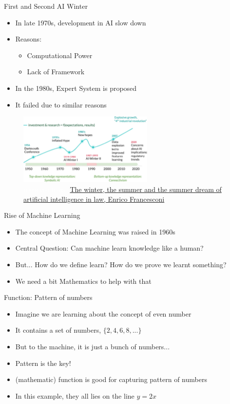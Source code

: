 \documentclass[10pt,xcolor={table,dvipsnames},t]{beamer}
\begin{document}
\begin{frame}{First and Second AI Winter}
  \begin{itemize}
    \item In late 1970s, development in AI slow down
    \item Reasons:
    \begin{itemize}
      \item Computational Power
      \item Lack of Framework
    \end{itemize}
    \item In the 1980s, Expert System is proposed
    \item It failed due to similar reasons
  \end{itemize}
  \begin{figure}
    \includegraphics[width=0.6\textwidth]{img/AIwinter.png}
    \caption{\textcolor{white}{retrieved from: } \href{https://link.springer.com/article/10.1007/s10506-022-09309-8}{The winter, the summer and the summer dream of artificial intelligence in law, Enrico Francesconi}}
  \end{figure}
\end{frame}

\begin{frame}{Rise of Machine Learning}
  \begin{itemize}
    \item The concept of Machine Learning was raised in 1960s
    \item Central Question: Can machine learn knowledge like a human?
    \item But... How do we define learn? How do we prove we learnt something?
    \item We need a bit Mathematics to help with that
  \end{itemize}
\end{frame}

\begin{frame}{Function: Pattern of numbers}
  \begin{itemize}
    \item Imagine we are learning about the concept of even number
    \item It contains a set of numbers, $\{2,4,6,8,...\}$
    \item But to the machine, it is just a bunch of numbers...
    \item Pattern is the key!
    \item (mathematic) function is good for capturing pattern of numbers
    \item In this example, they all lies on the line $y=2x$
  \end{itemize}
\end{frame}
\end{document}
